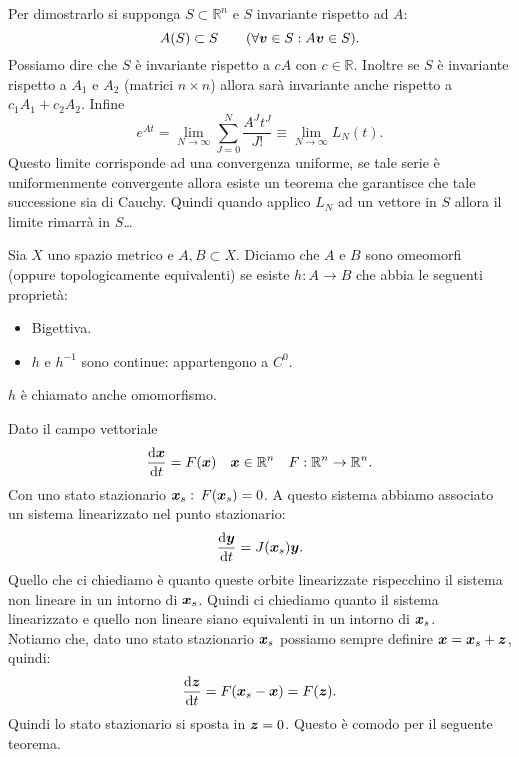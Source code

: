 \noindent
Per dimostrarlo si supponga $S \subset \mathbb{R}^n$ e $S$ invariante rispetto ad $A$:
\[
    A(S) \subset S \qquad (\forall \boldsymbol{v}\in S: A\boldsymbol{v}\in S) 
.\] 
Possiamo dire che $S$  è invariante rispetto a $cA$  con $c\in \mathbb{R}$. Inoltre se $S$  è invariante rispetto a $A_1$  e $A_2$  (matrici $n \times n$) allora sarà invariante anche rispetto a $c_1A_1 + c_2A_2$. Infine
\[
    e^{At}=\lim_{N \to \infty}\sum_{J=0}^{N} \frac{A^J t^J}{J!} \equiv \lim_{N \to \infty} L_N(t) 
.\] 
Questo limite corrisponde ad una convergenza uniforme, se tale serie è uniformenmente convergente allora esiste un teorema che garantisce che tale successione sia di Cauchy. Quindi quando applico $L_N$ ad un vettore in $S$ allora il limite rimarrà in $S$\ldots{} 


\begin{defn}
    Sia $X$ uno spazio metrico e $A, B \subset X$. Diciamo che $A$ e $B$ sono omeomorfi (oppure topologicamente equivalenti) se esiste $h:A\to B$ che abbia le seguenti proprietà:
    \begin{itemize}
	\item Bigettiva.
	\item $h$ e $h^{-1}$ sono continue: appartengono a $C^0$.
    \end{itemize}
    $h$ è chiamato anche omomorfismo.
\end{defn}
\noindent
Dato il campo vettoriale 
\[
    \frac{\text{d} \boldsymbol{x}}{\text{d} t} = F(\boldsymbol{x}) \quad  \boldsymbol{x}\in \mathbb{R}^n \quad  F:\mathbb{R}^n\to \mathbb{R}^n
.\] 
Con uno stato stazionario $\boldsymbol{x}_s: $  $F(\boldsymbol{x}_s) =0$. A questo sistema abbiamo associato un sistema linearizzato nel punto stazionario:
\[
    \frac{\text{d} \boldsymbol{y}}{\text{d} t} = J(\boldsymbol{x}_s) \boldsymbol{y}
.\] 
Quello che ci chiediamo è quanto queste orbite linearizzate rispecchino il sistema non lineare in un intorno di $\boldsymbol{x}_s$. Quindi ci chiediamo quanto il sistema linearizzato e quello non lineare siano equivalenti in un intorno di $\boldsymbol{x}_s$.\\
Notiamo che, dato uno stato stazionario $\boldsymbol{x}_s$ possiamo sempre definire $\boldsymbol{x}=\boldsymbol{x}_s + \boldsymbol{z}$, quindi:
\[
    \frac{\text{d} \boldsymbol{z}}{\text{d} t} = F(\boldsymbol{x}_s - \boldsymbol{x}) = F(\boldsymbol{z}) 
.\] 
Quindi lo stato stazionario si sposta in $\boldsymbol{z}=0$. Questo è comodo per il seguente teorema.

